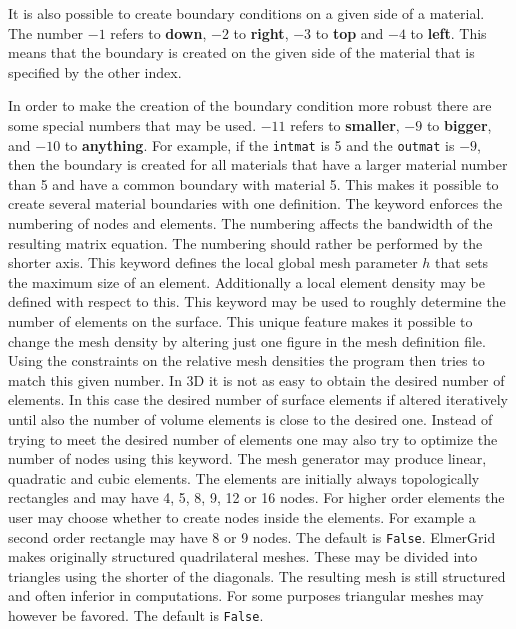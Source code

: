 It is also possible to create boundary conditions on a 
given side of a material. The number $-1$ refers to \textbf{down},
$-2$ to \textbf{right}, $-3$ to \textbf{top} and $-4$ to \textbf{left}. 
This means that the boundary is created on the given side 
of the material that is specified by the other index.

In order to make the creation of the boundary condition
more robust there are some special numbers that may be used.
$-11$ refers to \textbf{smaller}, $-9$ to \textbf{bigger}, 
and $-10$ to \textbf{anything}. For example, if the 
\texttt{intmat} is 5 and the \texttt{outmat} is $-9$, then
the boundary is created for all materials that have a larger
material number than 5 and have a common boundary with 
material 5. This makes it possible to create several 
material boundaries with one definition.
%
The keyword enforces the numbering of nodes and elements.
The numbering affects the 
bandwidth of the resulting matrix equation.
The numbering should rather be performed by the shorter axis.
%
This keyword defines the local global mesh parameter $h$ that
sets the maximum size of an element. Additionally a local element density
may be defined with respect to this. 
%
This keyword may be used to roughly determine the number
of elements on the surface. This unique feature makes it possible to
change the mesh density by altering just one figure in the
mesh definition file.
Using the constraints on the relative mesh densities 
the program then tries to match this given number.  
%
In 3D it is not as easy to obtain the desired 
number of elements. In this case the desired number of surface elements
if altered iteratively until also the number of volume elements is close to the
desired one.
%
Instead of trying to meet the desired number of elements one may also 
try to optimize the number of nodes using this keyword.
%
The mesh generator may produce linear, quadratic and 
cubic elements. 
The elements are initially always topologically rectangles and
may have 4, 5, 8, 9, 12 or 16 nodes. 
%
For higher order elements the user may choose whether to
create nodes inside the elements. For example a second order rectangle 
may have 8 or 9 nodes. The default is \texttt{False}.
%
ElmerGrid makes originally structured quadrilateral meshes.
These may be divided into triangles 
using the shorter of the diagonals.
The resulting mesh is still structured and
often inferior in computations. For some purposes triangular meshes 
may however be favored. The default is \texttt{False}.

